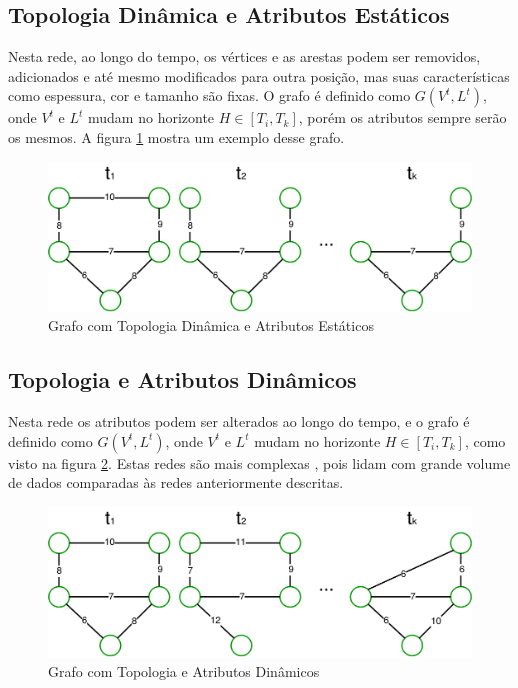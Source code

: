 \subsection{Topologia Dinâmica e Atributos Estáticos}
\label{subsec:topdinatribest}
Nesta rede, ao longo do tempo, os vértices e as arestas podem ser removidos, adicionados e até mesmo
modificados para outra posição, mas suas características como espessura, cor e tamanho são fixas.
O grafo é definido como $G(V^t, L^t)$, onde $V^t$ e $L^t$ mudam no horizonte $H \in [T_i, T_k]$,
porém os atributos sempre serão os mesmos. A figura \ref{fig:tdae} mostra um exemplo desse grafo.

\begin{figure}[htbp]
\centering
 \includegraphics[width=.80\textwidth]{chapters/fig/tdae.png}
\caption{Grafo com Topologia Dinâmica e Atributos Estáticos}
\label{fig:tdae}
\end{figure}

\FloatBarrier

\subsection{Topologia e Atributos Dinâmicos}
\label{subsec:topdinatridin}
Nesta rede os atributos podem ser alterados ao longo do tempo, e o grafo é definido como $G(V^t, L^t)$,
onde $V^t$ e $L^t$ mudam no horizonte $H \in [T_i, T_k]$, como visto na figura \ref{fig:tdad}.
Estas redes são mais complexas \cite{dynagraph}, pois lidam com grande volume de dados comparadas às redes anteriormente descritas.

\begin{figure}[htbp]
\centering
 \includegraphics[width=.80\textwidth]{chapters/fig/tdad.png}
\caption{Grafo com Topologia e Atributos Dinâmicos}
\label{fig:tdad}
\end{figure}

